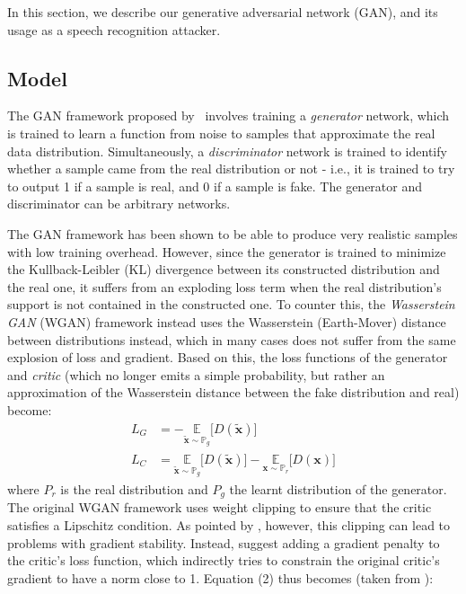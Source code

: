 In this section, we describe our generative adversarial network (GAN), and its usage as a speech recognition attacker. 
\subsection{Model}
The GAN framework proposed by~\cite{goodfellow2014generative} involves training a 
\textit{generator} network, which is trained to learn a function from noise to samples
that approximate the real data distribution. Simultaneously, a
\textit{discriminator} network is trained to identify whether a sample came from
the real distribution or not - i.e., it is trained to try to output 1 if a sample is real, and 0 if a sample is fake. The generator and discriminator can be arbitrary networks.

The GAN framework has been shown to be able to produce very realistic samples with low training overhead. However, since the generator is trained to minimize the Kullback-Leibler (KL) divergence between its constructed distribution and the real one, it suffers from an exploding loss term when the real distribution's support is not contained in the constructed one. To counter this, the \textit{Wasserstein GAN} \cite{arjovsky2017wasserstein} (WGAN) framework instead uses the Wasserstein (Earth-Mover) distance between distributions instead, which in many cases does not suffer from the same explosion of loss and gradient. Based on this, the loss functions of the generator and \textit{critic} (which no longer emits a simple probability, but rather an approximation of the Wasserstein distance between the fake distribution and real) become:
\begin{align}
    L_G &= -\underset{\boldsymbol{\widetilde{x}} \sim \mathbb{P}_{g}}{\mathbb{E}}  \big[D(\boldsymbol{\widetilde{x}})\big] \\
    L_C &= \underset{\boldsymbol{\widetilde{x}} \sim \mathbb{P}_{g}}{\mathbb{E}}  \big[D(\boldsymbol{\widetilde{x}})\big] - \underset{\boldsymbol{x} \sim \mathbb{P}_{r}}{\mathbb{E}}  \big[D(\boldsymbol{x})\big]
\end{align}
where $P_r$ is the real distribution and $P_g$ the learnt distribution of the generator. \\
The original WGAN framework uses weight clipping to ensure that the critic satisfies a Lipschitz condition. As pointed by \cite{gulrajani2017improved}, however, this clipping can lead to problems with gradient stability. Instead, \cite{gulrajani2017improved} suggest adding a gradient penalty to the critic's loss function, which indirectly tries to constrain the original critic's gradient to have a norm close to 1. Equation (2) thus becomes (taken from \cite{gulrajani2017improved}):
